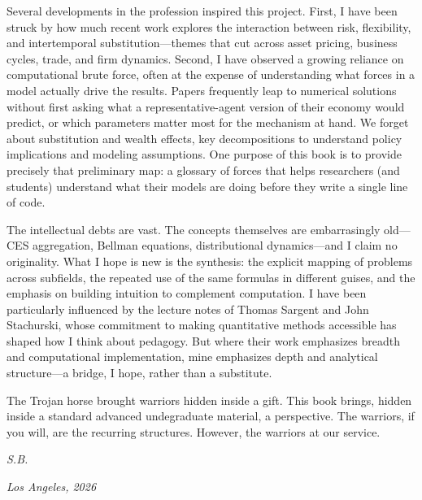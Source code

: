 Several developments in the profession inspired this project. First, I have been struck by how much recent work explores the interaction between risk, flexibility, and intertemporal substitution---themes that cut across asset pricing, business cycles, trade, and firm dynamics. Second, I have observed a growing reliance on computational brute force, often at the expense of understanding what forces in a model actually drive the results. Papers frequently leap to numerical solutions without first asking what a representative-agent version of their economy would predict, or which parameters matter most for the mechanism at hand. We forget about substitution and wealth effects, key decompositions to understand policy implications and modeling assumptions. One purpose of this book is to provide precisely that preliminary map: a glossary of forces that helps researchers (and students) understand what their models are doing before they write a single line of code.

The intellectual debts are vast. The concepts themselves are embarrasingly old---CES aggregation, Bellman equations, distributional dynamics---and I claim no originality. What I hope is new is the synthesis: the explicit mapping of problems across subfields, the repeated use of the same formulas in different guises, and the emphasis on building intuition to complement computation. I have been particularly influenced by the lecture notes of Thomas Sargent and John Stachurski, whose commitment to making quantitative methods accessible has shaped how I think about pedagogy. But where their work emphasizes breadth and computational implementation, mine emphasizes depth and analytical structure---a bridge, I hope, rather than a substitute.

The Trojan horse brought warriors hidden inside a gift. This book brings, hidden inside a standard advanced undegraduate material, a perspective. The warriors, if you will, are the recurring structures. However, the warriors at our service.

\vspace{1cm}
\hfill\textit{S.B.}

\hfill\textit{Los Angeles, 2026}